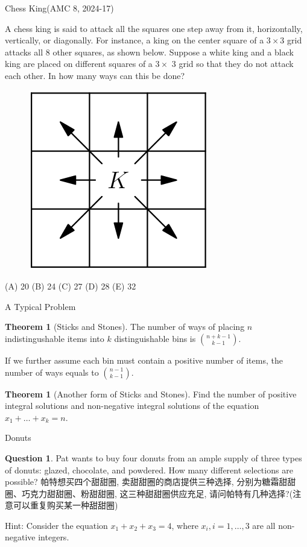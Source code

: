 \documentclass{beamer}
\theoremstyle{definition}
\newtheorem{theo}[defn]{Theorem}
\newtheorem{ques}[defn]{Question}
\begin{document}
\begin{frame}{Chess King(AMC 8, 2024-17)}
    
        A chess king is said to attack all the squares one step away from it, horizontally, vertically, or diagonally. For instance, a king on the center square of a $3 \times 3$ grid attacks all 8 other squares, as shown below. Suppose a white king and a black king are placed on different squares of a $3 \times$ 3 grid so that they do not attack each other. 
        In how many ways can this be done?
        \begin{figure}
            \includegraphics[height=0.3\textheight]{chessking.png}
        \end{figure}
        (A) 20 (B) 24 (C) 27 (D) 28 (E) 32
    
\end{frame}
\begin{frame}{A Typical Problem}
    \begin{theo}[Sticks and Stones]
        The number of ways of placing $n$ indistingushable items into $k$ distinguishable bins is $\binom{n+k-1}{k-1}$.

        If we further assume each bin must contain a positive number of items, the number of ways equals to $\binom{n-1}{k-1}$.
    \end{theo}
    \begin{theo}[Another form of Sticks and Stones]
        Find the number of positive integral solutions and non-negative integral solutions of the equation $x_1+\dots+x_k=n$.
    \end{theo}
\end{frame}
\begin{frame}{Donuts}
    \begin{ques}
        Pat wants to buy four donuts from an ample supply of three types of donuts: glazed, chocolate, and powdered. How many different
        selections are possible?
        帕特想买四个甜甜圈, 卖甜甜圈的商店提供三种选择, 分别为糖霜甜甜圈、巧克力甜甜圈、粉甜甜圈, 这三种甜甜圈供应充足, 请问帕特有几种选择?(注意可以重复购买某一种甜甜圈)
    \end{ques}
        Hint: Consider the equation $x_1+x_2+x_3=4$, where $x_i,i=1,\dots,3$ are all non-negative integers.
\end{frame}
\end{document}
